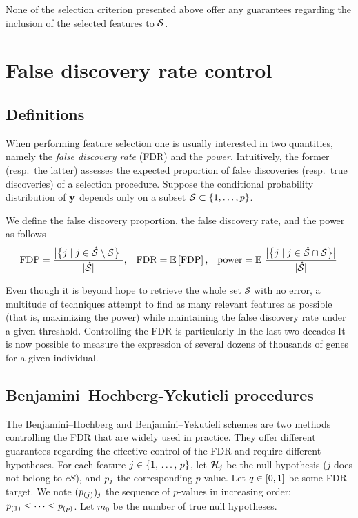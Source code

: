 None of the selection criterion presented above offer any guarantees regarding
the inclusion of the selected features to $\mathcal{S}$.


\section{False discovery rate control}\label{sec:fdrc}
%
\subsection{Definitions}\label{subsec:fdr_def}
%
When performing feature selection one is usually interested in two quantities,
namely the \emph{false discovery rate} (FDR) and the \emph{power}.
Intuitively, the former (resp.\ the latter) assesses the expected proportion of false discoveries
(resp.\ true discoveries) of a selection procedure.
Suppose the conditional probability distribution of $\mathbf{y}$ depends only on a subset
$\mathcal{S} \subset \left\{ 1, \dots, p \right\}$.

We define the false discovery proportion, the false discovery rate, and the power as follows
\begin{equation}\label{eq:fdr_def}
\text{FDP} = \frac
{\big\lvert\big\{ j \mid j \in \hat{\mathcal{S}} \setminus \mathcal{S} \big\}\big\rvert}
{\lvert\hat{\mathcal{S}}\rvert}
\text{,}\quad
\text{FDR} = {\mathbb E}\left[\text{FDP}\right]
\text{,}\quad
\text{power} = {\mathbb E}\left.
\frac
{\big\lvert\big\{ j \mid j \in \hat{\mathcal{S}} \cap \mathcal{S} \big\}\big\rvert}
{\lvert\hat{\mathcal{S}}\rvert}
\right.
\end{equation}

Even though it is beyond hope to retrieve the whole set $\mathcal{S}$ with no error,
a multitude of techniques attempt to find as many relevant features as possible
(that is, maximizing the power)
while maintaining the false discovery rate under a given threshold.
Controlling the FDR is particularly
In the last two decades
It is now possible to measure the expression of several dozens of thousands of genes for a given individual.

\subsection{Benjamini–Hochberg-Yekutieli procedures}\label{subsec:bhq}

The Benjamini–Hochberg and Benjamini–Yekutieli schemes are two methods controlling the FDR
that are widely used in practice.
They offer different guarantees regarding the effective control of the FDR and require different hypotheses.
For each feature $j \in \left\{ 1,\, \dots,\, p \right\}$, let $\mathcal{H}_j$ be the null hypothesis ($j$ does not belong to $cS$),
and $p_j$ the corresponding $p$-value.
Let $q \in [0, 1]$ be some FDR target.
We note $(p_{(j)})_j$ the sequence of $p$-values in increasing order;
$p_{(1)} \leq \dots \leq p_{(p)}$.
Let $m_0$ be the number of true null hypotheses.

